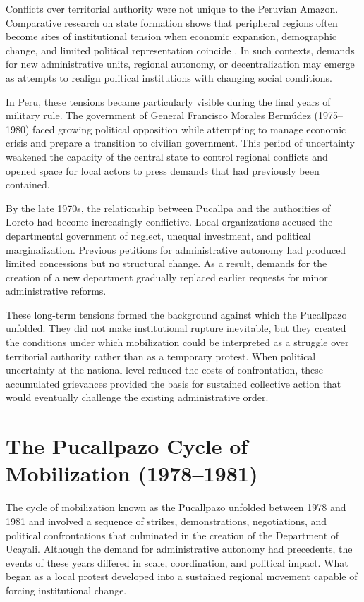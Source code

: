 \documentclass[12pt]{article}
\begin{document}
Conflicts over territorial authority were not unique to the Peruvian
Amazon. Comparative research on state formation shows that peripheral
regions often become sites of institutional tension when economic
expansion, demographic change, and limited political representation
coincide \autocite{boone_political_2003}. In such contexts, demands for new
administrative units, regional autonomy, or decentralization may emerge
as attempts to realign political institutions with changing social
conditions.

In Peru, these tensions became particularly visible during the final
years of military rule. The government of General Francisco Morales
Bermúdez (1975--1980) faced growing political opposition while attempting
to manage economic crisis and prepare a transition to civilian government.
This period of uncertainty weakened the capacity of the central state to
control regional conflicts and opened space for local actors to press
demands that had previously been contained.

By the late 1970s, the relationship between Pucallpa and the authorities
of Loreto had become increasingly conflictive. Local organizations accused
the departmental government of neglect, unequal investment, and political
marginalization. Previous petitions for administrative autonomy had
produced limited concessions but no structural change. As a result,
demands for the creation of a new department gradually replaced earlier
requests for minor administrative reforms.

These long-term tensions formed the background against which the
Pucallpazo unfolded. They did not make institutional rupture inevitable,
but they created the conditions under which mobilization could be
interpreted as a struggle over territorial authority rather than as a
temporary protest. When political uncertainty at the national level
reduced the costs of confrontation, these accumulated grievances provided
the basis for sustained collective action that would eventually challenge
the existing administrative order.

\section{The Pucallpazo Cycle of Mobilization (1978--1981)}

The cycle of mobilization known as the Pucallpazo unfolded between 1978
and 1981 and involved a sequence of strikes, demonstrations, negotiations,
and political confrontations that culminated in the creation of the
Department of Ucayali. Although the demand for administrative autonomy
had precedents, the events of these years differed in scale, coordination,
and political impact. What began as a local protest developed into a
sustained regional movement capable of forcing institutional change.
\end{document}
